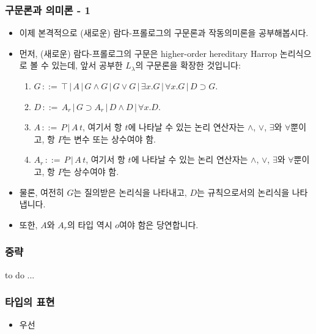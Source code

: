 \documentclass[slidestop,compress,mathserif]{beamer}
\begin{document}
    \begin{frame}
        \frametitle{구문론과 의미론 - 1}
        \begin{itemize}
            \item 이제 본격적으로 (새로운) 람다-프롤로그의 구문론과 작동의미론을 공부해봅시다.
            \item 먼저, (새로운) 람다-프롤로그의 구문은 higher-order hereditary Harrop 논리식으로 볼 수 있는데, 앞서 공부한 $L_\lambda$의 구문론을 확장한 것입니다:
            \begin{enumerate}
                \item $G \, ::= \, \top \, | \, A \, | \, G \land G \, | \, G \lor G \, | \, \exists x . G \, | \, \forall x . G \, | \, D \supset G$.
                \item $D \, ::= \, A_r \, | \, G \supset A_r \, | \, D \land D \, | \, \forall x . D$.
                \item $A \, ::= \, P \, | \, A \, t$, 여기서 항 $t$에 나타날 수 있는 논리 연산자는 $\land$, $\lor$, $\exists$와 $\forall$뿐이고, 항 $P$는 변수 또는 상수여야 함.
                \item $A_r \, ::= \, P \, | \, A \, t$, 여기서 항 $t$에 나타날 수 있는 논리 연산자는 $\land$, $\lor$, $\exists$와 $\forall$뿐이고, 항 $P$는 상수여야 함.
            \end{enumerate}
            \item 물론, 여전히 $G$는 질의받은 논리식을 나타내고, $D$는 규칙으로서의 논리식을 나타냅니다.
            \item 또한, $A$와 $A_r$의 타입 역시 $o$여야 함은 당연합니다.
        \end{itemize}
    \end{frame}

    \begin{frame}
        \frametitle{중략}
        to do ...
    \end{frame}

    \begin{frame}
        \frametitle{타입의 표현}
        \begin{itemize}
            \item 우선 
        \end{itemize}
    \end{frame}
\end{document}
